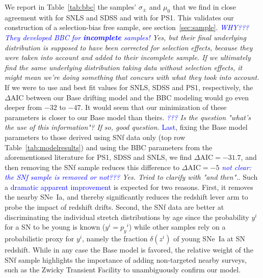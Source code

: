 \documentclass[]{aa} %
\newcommand{\mr}[1]{{\textcolor[rgb]{0.60,0.10,0.6}{#1}}}
\newcommand{\nn}[1]{{\textcolor[rgb]{1, 0.27, 0}{#1}}}
\newcommand{\yc}[1]{{\textcolor{blue}{#1}}}
\begin{document}
\mr{We report in Table~\ref{tab:bbc} the samples' $\sigma_{\pm}$ and
    $\mu_0$ that we find in close agreement with \cite{scolnic2016} for SNLS and
    SDSS and with \cite{scolnic2018a} for PS1. This validates \nn{our} construction
    of \nn{a} selection-bias free sample, see
    section~\ref{sec:sample}. \textit{\yc{WHY??? They developed BBC for \textbf{incomplete} samples!} \nn{Yes, but their final underlying distribution
    is supposed to have been corrected for selection effects, because they were
    taken into account and added to their incomplete sample. If we ultimately find
    the same underlying distribution taking data without selection effects,
    it might mean we're doing something that concurs with what they took into
    account.}} If we were to use \cite{scolnic2016} and
    \cite{scolnic2018a} best fit values for SNLS, SDSS and PS1, respectively,
    the $\Delta\mathrm{AIC}$ between our Base drifting model and the BBC
    modeling would go even deeper from $-32$ to $-47$. \nn{It would seem that our minimization
    of these parameters is closer to our Base model than theirs}. \textit{\yc{???} \nn{Is the question "what's the use of this information"? If so, good question.}} \yc{Last},
    fixing the Base model parameters to those derived using SNf data only (top
    row Table~\ref{tab:modelresults}) and using the BBC parameters from the
    aforementioned literature for PS1, SDSS and SNLS, we find
    $\Delta\mathrm{AIC}=-31.7$, \nn{and then} removing the SNf sample reduces this difference to
    $\Delta\mathrm{AIC}=-5$ \textit{\yc{not clear: the SNf sample is removed or not???} \nn{Yes. Tried to clarify with "and then".}}. Such a \yc{dramatic apparent improvement} is expected for two reasons.
    First, it removes the nearby SNe~Ia, and thereby significantly reduces the
    redshift \nn{lever} arm to probe the impact of redshift drifts.
    Second, the SNf data are better at discriminating the individual stretch
    distributions by age since the probability $y^i$ for a SN to be young is
    known ($y^i = p_y{}^i$) while other samples rely on a probabilistic proxy for
    $y^i$, namely the fraction $\delta(z^i)$ 
    of young SNe~Ia at SN redshift. While in any case the Base model is favored, the relative weight
    of the SNf sample highlights the importance of adding non-targeted nearby
surveys, such as the Zwicky Transient Facility \cite[ZTF,][]{bellm2019,
graham2019} to unambiguously confirm our \nn{model}.}

\end{document}
